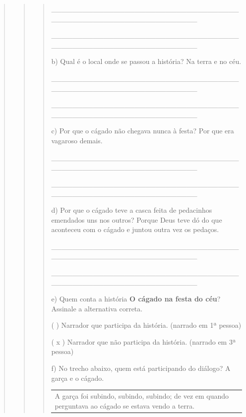\begin{quote}
\begin{quote}
\begin{quote}
\_\_\_\_\_\_\_\_\_\_\_\_\_\_\_\_\_\_\_\_\_\_\_\_\_\_\_\_\_\_\_\_\_\_\_\_\_\_\_\_\_\_\_\_\_\_\_\_\_\_\_\_\_\_\_\_\_\_\_\_\_\_\_\_

\_\_\_\_\_\_\_\_\_\_\_\_\_\_\_\_\_\_\_\_\_\_\_\_\_\_\_\_\_\_\_\_\_\_\_\_\_\_\_\_\_\_\_\_\_\_\_\_\_\_\_\_\_\_\_\_\_\_\_\_\_\_\_\_

b) Qual é o local onde se passou a história? Na terra e no céu.

\_\_\_\_\_\_\_\_\_\_\_\_\_\_\_\_\_\_\_\_\_\_\_\_\_\_\_\_\_\_\_\_\_\_\_\_\_\_\_\_\_\_\_\_\_\_\_\_\_\_\_\_\_\_\_\_\_\_\_\_\_\_\_\_

\_\_\_\_\_\_\_\_\_\_\_\_\_\_\_\_\_\_\_\_\_\_\_\_\_\_\_\_\_\_\_\_\_\_\_\_\_\_\_\_\_\_\_\_\_\_\_\_\_\_\_\_\_\_\_\_\_\_\_\_\_\_\_\_

c) Por que o cágado não chegava nunca à festa? Por que era vagaroso
demais.

\protect\hypertarget{_Hlk127856302}{}{}\_\_\_\_\_\_\_\_\_\_\_\_\_\_\_\_\_\_\_\_\_\_\_\_\_\_\_\_\_\_\_\_\_\_\_\_\_\_\_\_\_\_\_\_\_\_\_\_\_\_\_\_\_\_\_\_\_\_\_\_\_\_\_\_

\_\_\_\_\_\_\_\_\_\_\_\_\_\_\_\_\_\_\_\_\_\_\_\_\_\_\_\_\_\_\_\_\_\_\_\_\_\_\_\_\_\_\_\_\_\_\_\_\_\_\_\_\_\_\_\_\_\_\_\_\_\_\_\_

d) Por que o cágado teve a casca feita de pedacinhos emendados uns nos
outros? Porque Deus teve dó do que aconteceu com o cágado e juntou outra
vez os pedaços.

\_\_\_\_\_\_\_\_\_\_\_\_\_\_\_\_\_\_\_\_\_\_\_\_\_\_\_\_\_\_\_\_\_\_\_\_\_\_\_\_\_\_\_\_\_\_\_\_\_\_\_\_\_\_\_\_\_\_\_\_\_\_\_\_

\_\_\_\_\_\_\_\_\_\_\_\_\_\_\_\_\_\_\_\_\_\_\_\_\_\_\_\_\_\_\_\_\_\_\_\_\_\_\_\_\_\_\_\_\_\_\_\_\_\_\_\_\_\_\_\_\_\_\_\_\_\_\_\_

e) Quem conta a história \textbf{O cágado na festa do céu}? Assinale a
alternativa correta.

( ) Narrador que participa da história. (narrado em 1ª pessoa)

( x ) Narrador que não participa da história. (narrado em 3ª pessoa)

f) No trecho abaixo, quem está participando do diálogo? A garça e o
cágado.

\begin{longtable}[]{@{}l@{}}
\toprule
\begin{minipage}[t]{0.97\columnwidth}\raggedright\strut
A garça foi subindo, subindo, subindo; de vez em quando perguntava ao
cágado se estava vendo a terra.


\end{minipage}
\end{longtable}
\end{quote}
\end{quote}
\end{quote}
